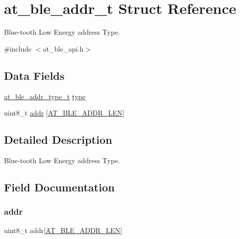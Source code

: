 \hypertarget{structat__ble__addr__t}{}\section{at\+\_\+ble\+\_\+addr\+\_\+t Struct Reference}
\label{structat__ble__addr__t}


Blue-\/tooth Low Energy address Type.  




{\ttfamily \#include $<$at\+\_\+ble\+\_\+api.\+h$>$}

\subsection*{Data Fields}
\begin{DoxyCompactItemize}
\item 
\mbox{\hyperlink{at__ble__api_8h_aab076e537bd99ea1be0fbf95a2d16be4}{at\+\_\+ble\+\_\+addr\+\_\+type\+\_\+t}} \mbox{\hyperlink{structat__ble__addr__t_ad1b08ab8241c7861e6beb41cd9518f40}{type}}
\item 
uint8\+\_\+t \mbox{\hyperlink{structat__ble__addr__t_a9a3d982980a4f1c2f7bd948b90adf5ce}{addr}} \mbox{[}\mbox{\hyperlink{at__ble__api_8h_a2452b42d01f07d3cd766fcab56d3ae62}{A\+T\+\_\+\+B\+L\+E\+\_\+\+A\+D\+D\+R\+\_\+\+L\+EN}}\mbox{]}
\end{DoxyCompactItemize}


\subsection{Detailed Description}
Blue-\/tooth Low Energy address Type. 

\subsection{Field Documentation}
\mbox{\label{structat__ble__addr__t_a9a3d982980a4f1c2f7bd948b90adf5ce}} 
\subsubsection{\texorpdfstring{addr}{addr}}
{\footnotesize\ttfamily uint8\+\_\+t addr\mbox{[}\mbox{\hyperlink{at__ble__api_8h_a2452b42d01f07d3cd766fcab56d3ae62}{A\+T\+\_\+\+B\+L\+E\+\_\+\+A\+D\+D\+R\+\_\+\+L\+EN}}\mbox{]}}

